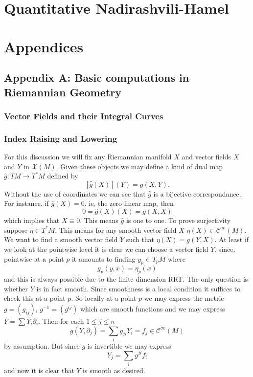 \chapter{Quantitative Nadirashvili-Hamel}



\chapter{Appendices}
\section{Appendix A: Basic computations in Riemannian Geometry}

\subsection{Vector Fields and their Integral Curves}

\subsection{Index Raising and Lowering}

For this discussion we will fix any Riemannian manifold $X$ and vector fields $X$ and $Y$ in $\mathcal{X}(M)$. Given these objects we may define a kind of dual map $\hat{g}: TM \to T^*M$ defined by
\[[\hat{g}(X)](Y) = g(X, Y).\] Without the use of coordinates we can see that $\hat{g}$ is a bijective correspondance. For instance, if $\hat{g}(X) = 0$, ie, the zero linear map, then 
\[0 = \hat{g}(X)(X) = g(X, X)\] which implies that $X \equiv 0$. This means $\hat{g}$ is one to one. To prove surjectivity suppose $\eta \in T^*M$. This means for any smooth vector field $X$ $\eta(X) \in \mathcal{C}^\infty(M)$. We want to find a smooth vector field $Y$ such that $\eta(X) = g(Y, X)$. At least if we look at the pointwise level it is clear we can choose a vector field $Y$. since, pointwise at a point $p$ it amounts to finding $y_p \in T_pM$ where
\[g_p(y, x) = \eta_p(x)\]
and this is always possible due to the finite dimension RRT. The only question is whether $Y$ is in fact smooth. Since smoothness is a local condition it suffices to check this at a point $p$. So locally at a point $p$ we may express the metric $g = (g_{ij})$, $g^{-1} = (g^{ij})$ which are smooth functions and we may express $Y = \sum Y_i \partial_i$. Then for each $1 \leq j \leq n$
\[g(Y, \partial_j) = \sum_i g_{ji}Y_i = f_j \in \mathcal{C}^{\infty}(M)\] by assumption. But since $g$ is invertible we may express 
\[Y_j = \sum_{i}g^{ji}f_i\]
and now it is clear that $Y$ is smooth as desired.

